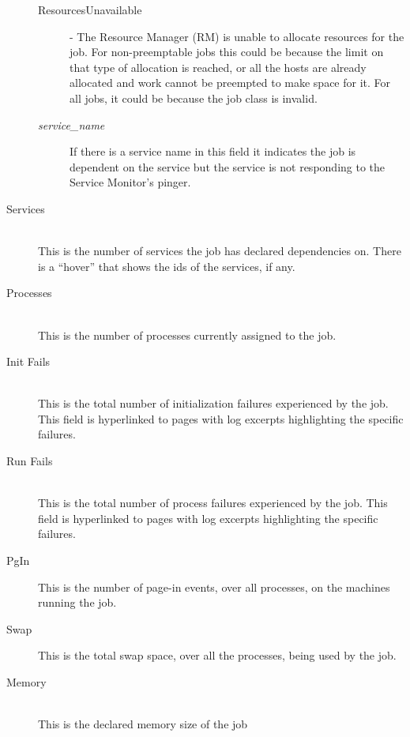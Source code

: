 \begin{description}
\begin{description}
                  \item[ResourcesUnavailable] - The Resource Manager (RM) is unable to allocate resources for 
                    the job. For non-preemptable jobs this could be because the limit on that type of allocation is 
                    reached, or all the hosts are already allocated and work cannot be preempted to make space for 
                    it. For all jobs, it could be because the job class is invalid. 
                    \item[{\em service\_name}] If there is a service name in this field it indicates the job is
                      dependent on the service but the service is not responding to the {\DUCC} Service Monitor's
                      pinger.
              \end{description}

            \item[Services] \hfill \\
              This is the number of services the job has declared dependencies on.  There is a ``hover'' that
              shows the ids of the services, if any.

            \item[Processes] \hfill \\
              This is the number of processes currently assigned to the job.

            \item[Init Fails] \hfill \\
              This is the total number of initialization failures experienced by the job. This
              field is hyperlinked to pages with log excerpts highlighting the specific failures.
              
            \item[Run Fails] \hfill \\
              This is the total number of process failures experienced by the job. This field is
              hyperlinked to pages with log excerpts highlighting the specific failures.
              
            \item[PgIn] This is the number of page-in events, over all processes, on the machines
              running the job.

            \item[Swap] This is the total swap space, over all the processes, being used by the job.

            \item[Memory] \hfill \\
              This is the declared memory size of the job
              

\end{description}
